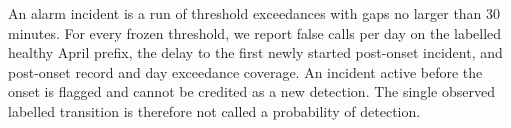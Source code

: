 An alarm incident is a run of threshold exceedances with gaps no larger than
30 minutes. For every frozen threshold, we report false calls per day on the
labelled healthy April prefix, the delay to the first newly started
post-onset incident, and post-onset record and day exceedance coverage. An
incident active before the onset is flagged and cannot be credited as a new
detection. The single observed labelled transition is therefore not called a
probability of detection.
